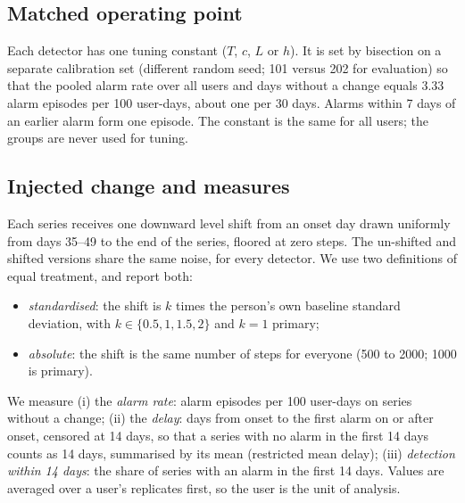 \documentclass[11pt,a4paper]{article}
\begin{document}
\subsection{Matched operating point}
Each detector has one tuning constant ($T$, $c$, $L$ or $h$). It is set by bisection on a separate calibration set (different random seed; 101 versus 202 for evaluation) so that the pooled alarm rate over all users and days without a change equals 3.33 alarm episodes per 100 user-days, about one per 30 days. Alarms within 7 days of an earlier alarm form one episode. The constant is the same for all users; the groups are never used for tuning.

\subsection{Injected change and measures}
Each series receives one downward level shift from an onset day drawn uniformly from days 35--49 to the end of the series, floored at zero steps. The un-shifted and shifted versions share the same noise, for every detector. We use two definitions of equal treatment, and report both:
\begin{itemize}
  \item \emph{standardised}: the shift is $k$ times the person's own baseline standard deviation, with $k\in\{0.5,1,1.5,2\}$ and $k=1$ primary;
  \item \emph{absolute}: the shift is the same number of steps for everyone (500 to 2000; 1000 is primary).
\end{itemize}
We measure (i) the \emph{alarm rate}: alarm episodes per 100 user-days on series without a change; (ii) the \emph{delay}: days from onset to the first alarm on or after onset, censored at 14 days, so that a series with no alarm in the first 14 days counts as 14 days, summarised by its mean (restricted mean delay); (iii) \emph{detection within 14 days}: the share of series with an alarm in the first 14 days. Values are averaged over a user's replicates first, so the user is the unit of analysis.
\end{document}
